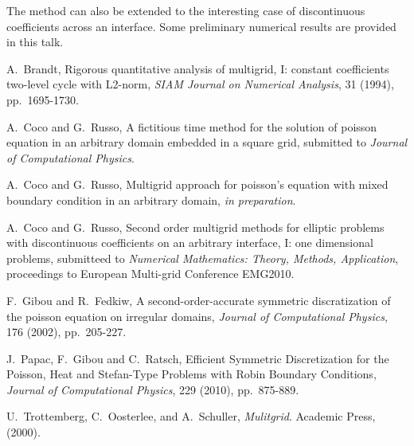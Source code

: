 \documentclass{report}
\begin{document}
The method can also be extended to the interesting case of discontinuous
coefficients across an interface. Some preliminary numerical results are
provided in this talk.

\begin{thebibliography}{100}

A.~Brandt, Rigorous quantitative analysis of multigrid, I: constant
coefficients two-level cycle with L2-norm,
{\em SIAM Journal on Numerical Analysis}, 31 (1994), pp.~1695-1730.

A.~Coco and G.~Russo, A fictitious time method for the solution of
poisson equation in an arbitrary domain embedded in a square grid,
submitted to {\em Journal of Computational Physics}.

A.~Coco and G.~Russo, Multigrid approach for poisson's equation with
mixed boundary condition in an arbitrary domain, {\em in preparation}.

A.~Coco and G.~Russo, Second order multigrid methods for elliptic
problems with discontinuous coefficients on an arbitrary interface, I:
one dimensional problems, submitteed to {\em Numerical Mathematics:
Theory, Methods, Application}, proceedings to European Multi-grid
Conference EMG2010.

F.~Gibou and R.~Fedkiw, A second-order-accurate symmetric discratization
of the poisson equation on irregular domains,
{\em Journal of Computational Physics}, 176 (2002), pp.~205-227.

J.~Papac, F.~Gibou and C.~Ratsch, Efficient Symmetric Discretization for
the Poisson, Heat and Stefan-Type Problems with Robin Boundary
Conditions,
{\em Journal of Computational Physics}, 229 (2010), pp.~875-889.

U.~Trottemberg, C.~Oosterlee, and A.~Schuller, {\em Mulitgrid}. Academic Press, (2000).

\end{thebibliography}
\end{document}
